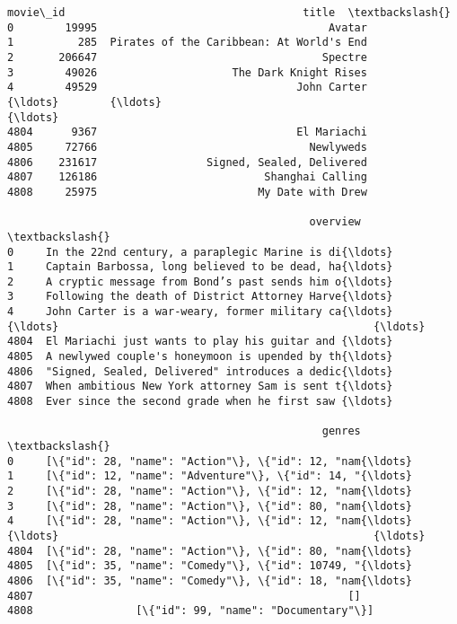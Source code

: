 \documentclass[11pt]{article}
\makeatletter
\newcommand{\boxspacing}{\kern\kvtcb@left@rule\kern\kvtcb@boxsep}
\newcommand{\prompt}[4]{
        {\ttfamily\llap{{\color{#2}[#3]:\hspace{3pt}#4}}\vspace{-\baselineskip}}
    }
\makeatother
\begin{document}
            \begin{tcolorbox}[breakable, size=fbox, boxrule=.5pt, pad at break*=1mm, opacityfill=0]
\prompt{Out}{outcolor}{10}{\boxspacing}
\begin{Verbatim}[commandchars=\\\{\}]
      movie\_id                                     title  \textbackslash{}
0        19995                                    Avatar
1          285  Pirates of the Caribbean: At World's End
2       206647                                   Spectre
3        49026                     The Dark Knight Rises
4        49529                               John Carter
{\ldots}        {\ldots}                                       {\ldots}
4804      9367                               El Mariachi
4805     72766                                 Newlyweds
4806    231617                 Signed, Sealed, Delivered
4807    126186                          Shanghai Calling
4808     25975                         My Date with Drew

                                               overview  \textbackslash{}
0     In the 22nd century, a paraplegic Marine is di{\ldots}
1     Captain Barbossa, long believed to be dead, ha{\ldots}
2     A cryptic message from Bond’s past sends him o{\ldots}
3     Following the death of District Attorney Harve{\ldots}
4     John Carter is a war-weary, former military ca{\ldots}
{\ldots}                                                 {\ldots}
4804  El Mariachi just wants to play his guitar and {\ldots}
4805  A newlywed couple's honeymoon is upended by th{\ldots}
4806  "Signed, Sealed, Delivered" introduces a dedic{\ldots}
4807  When ambitious New York attorney Sam is sent t{\ldots}
4808  Ever since the second grade when he first saw {\ldots}

                                                 genres  \textbackslash{}
0     [\{"id": 28, "name": "Action"\}, \{"id": 12, "nam{\ldots}
1     [\{"id": 12, "name": "Adventure"\}, \{"id": 14, "{\ldots}
2     [\{"id": 28, "name": "Action"\}, \{"id": 12, "nam{\ldots}
3     [\{"id": 28, "name": "Action"\}, \{"id": 80, "nam{\ldots}
4     [\{"id": 28, "name": "Action"\}, \{"id": 12, "nam{\ldots}
{\ldots}                                                 {\ldots}
4804  [\{"id": 28, "name": "Action"\}, \{"id": 80, "nam{\ldots}
4805  [\{"id": 35, "name": "Comedy"\}, \{"id": 10749, "{\ldots}
4806  [\{"id": 35, "name": "Comedy"\}, \{"id": 18, "nam{\ldots}
4807                                                 []
4808                [\{"id": 99, "name": "Documentary"\}]


\end{Verbatim}
\end{tcolorbox}
\end{document}
